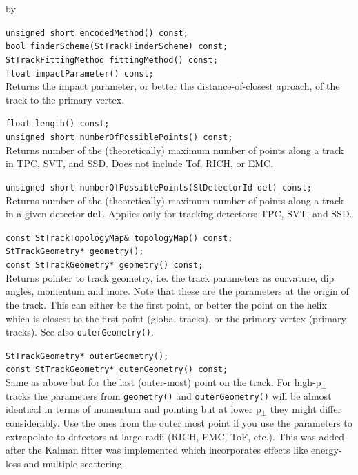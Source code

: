 \documentclass[twoside]{article}
\newcommand{\entrylabel}[1]{\mbox{\textbf{{#1}}}\hfil}%
\newenvironment{entry}
{\begin{list}{}%
    {\renewcommand{\makelabel}{\entrylabel}%
     \setlength{\labelwidth}{90pt}%
     \setlength{\leftmargin}{\labelwidth}
     \advance\leftmargin by \labelsep%
      }%
    }%
  {\end{list}}
\newcommand{\Entrylabel}[1]%
{\raisebox{0pt}[1ex][0pt]{\makebox[\labelwidth][l]%
    {\parbox[t]{\labelwidth}{\hspace{0pt}\textbf{{#1}}}}}}
\newenvironment{Entry}%
{\renewcommand{\entrylabel}{\Entrylabel}\begin{entry}}%
  {\end{entry}}
\begin{document}
\begin{Entry}
    \verb+unsigned short encodedMethod() const;+\\

    \verb+bool finderScheme(StTrackFinderScheme) const;+\\

    \verb+StTrackFittingMethod fittingMethod() const;+\\

    \verb+float impactParameter() const;+\\
    Returns the impact parameter, or better the distance-of-closest
    aproach, of the track to the primary vertex.
    
    \verb+float length() const;+\\

    \verb+unsigned short numberOfPossiblePoints() const;+\\
    Returns number of the (theoretically) maximum number of
    points along a track in TPC, SVT, and SSD. Does not include
    Tof, RICH, or EMC.
    
    \verb+unsigned short numberOfPossiblePoints(StDetectorId det) const;+\\
    Returns number of the (theoretically) maximum number of
    points along a track in a given detector \texttt{det}.
    Applies only for tracking detectors: TPC, SVT, and SSD.

    \verb+const StTrackTopologyMap& topologyMap() const;+\\
    

    \verb+StTrackGeometry* geometry();+\\
    \verb+const StTrackGeometry* geometry() const;+\\
    Returns pointer to track geometry, i.e. the track parameters as
    curvature, dip angles, momentum and more. Note that these are the
    parameters at the origin of the track. This can either be the
    first point, or better the point on the helix which is closest to
    the first point (global tracks), or the primary vertex (primary
    tracks). See also \texttt{outerGeometry()}.
    
    \verb+StTrackGeometry* outerGeometry();+\\
    \verb+const StTrackGeometry* outerGeometry() const;+\\
    Same as above but for the last (outer-most) point on the track.
    For high-p$_\perp$ tracks the parameters from \texttt{geometry()}
    and \texttt{outerGeometry()} will be almost identical in terms of
    momentum and pointing but at lower p$_\perp$ they might differ
    considerably.  Use the ones from the outer most point if you use
    the parameters to extrapolate to detectors at large radii (RICH,
    EMC, ToF, etc.).  This was added after the Kalman fitter was
    implemented which incorporates effects like energy-loss and
    multiple scattering.
    

\end{Entry}
\end{document}

